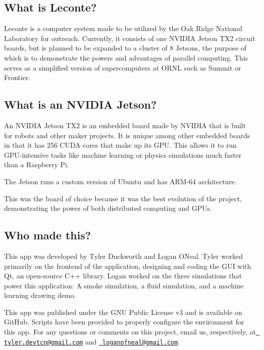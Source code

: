 \subsection*{What is Leconte?}



Leconte is a computer system made to be utilized by the Oak Ridge National Laboratory for outreach. Currently, it consists of one N\+V\+I\+D\+IA Jetson T\+X2 circuit boards, but is planned to be expanded to a cluster of 8 Jetsons, the purpose of which is to demonstrate the powers and advantages of parallel computing. This serves as a simplified version of supercomputers at O\+R\+NL such as Summit or Frontier.

\subsection*{What is an N\+V\+I\+D\+IA Jetson?}

An N\+V\+I\+D\+IA Jetson T\+X2 is an embedded board made by N\+V\+I\+D\+IA that is built for robots and other maker projects. It is unique among other embedded boards in that it has 256 C\+U\+DA cores that make up its G\+PU. This allows it to run G\+P\+U-\/intensive tasks like machine learning or physics simulations much faster than a Raspberry Pi.

The Jetson runs a custom version of Ubuntu and has A\+R\+M-\/64 architecture.

This was the board of choice because it was the best evolution of the project, demonstrating the power of both distributed computing and G\+P\+Us.

\subsection*{Who made this?}

This app was developed by Tyler Duckworth and Logan O\textquotesingle{}Neal. Tyler worked primarily on the frontend of the application, designing and coding the G\+UI with Qt, an open-\/source C++ library. Logan worked on the three simulations that power this application\+: A smoke simulation, a fluid simulation, and a machine learning drawing demo.

This app was published under the G\+NU Public License v3 and is available on Git\+Hub. Scripts have been provided to properly configure the environment for this app. For any questions or comments on this project, email us, respectively, at \href{mailto:tyler.devtcn@gmail.com}{\texttt{ tyler.\+devtcn@gmail.\+com}} and \href{mailto:loganofneal@gmail.com}{\texttt{ loganofneal@gmail.\+com}}. 